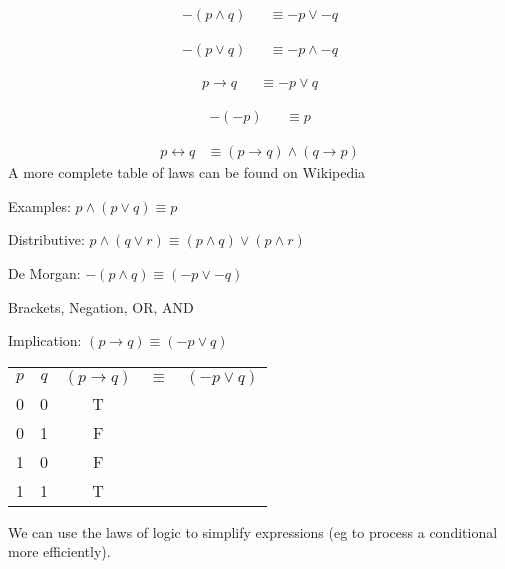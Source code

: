 \begin{align}
  -(p \land q) &
    & \equiv -p \lor -q
  \label{eq:deMorgan}
\end{align}

\begin{align}
  -(p \lor q) &
    & \equiv -p \land -q
  \label{eq:deMorgan2}
\end{align}

\begin{align}
  p \to q &
    & \equiv -p \lor q
  \label{eq:Impl}
\end{align}

\begin{align}
  -(-p) &
    & \equiv p
  \label{eq:2Neg}
\end{align}

\begin{align}
  p \leftrightarrow q
    & \equiv (p \to q) \land (q \to p)
  \label{eq:Equiv}
\end{align}
A more complete table of laws can be found on Wikipedia 


Examples:
$ p \land (p \lor q) \equiv p$

Distributive:
$ p \land (q \lor r) \equiv (p \land q) \lor (p \land r)$

De Morgan:
$ -(p \land q) \equiv (-p \lor -q)$
  
Brackets, Negation, OR, AND

Implication:
$ (p \to q) \equiv (-p \lor q)$
\begin{table}[!htb]
\label{tab:TruthTableTautology}
\begin{tabularx}{\linewidth}{| c | c | c | c | c |} \hline
  $p$ & $q$ & $(p \to q)$ & $\equiv$ & $(-p \lor q)$ \\
  0   &   0 &           T &          & \\
  0   &   1 &           F &          & \\
  1   &   0 &           F &          & \\
  1   &   1 &           T &          & \\
\end{tabularx}
\end{table}

We can use the laws of logic to simplify expressions (eg to process a
conditional more efficiently). \\

